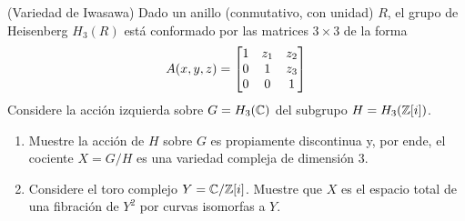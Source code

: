 \begin{exercise}
(Variedad de Iwasawa) Dado un anillo (conmutativo, con unidad) $R$, el grupo de Heisenberg $H_3(R)$ está conformado por las matrices $3 \times 3$ de la forma 
$$A(x,y,z) = \begin{bmatrix} 1 & z_1 & z_2 \\ 0 & 1 & z_3 \\ 0 & 0 & 1 \end{bmatrix}$$
Considere la acción izquierda sobre $G = H_3(\mathbb C)$ del subgrupo $H = H_3(\mathbb Z[i])$.

\begin{enumerate}[label=\alph*)]
    \item Muestre la acción de $H$ sobre $G$ es propiamente discontinua y, por ende, el cociente $X = G/H$ es una variedad compleja de dimensión $3$.
    
    \item Considere el toro complejo $Y = \mathbb C / \mathbb Z[i]$. Muestre que $X$ es el espacio total de una fibración de $Y^2$ por curvas isomorfas a $Y$.
\end{enumerate}
\end{exercise}

